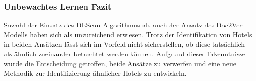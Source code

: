 \subsubsection{Unbewachtes Lernen Fazit}
\label{subsubsec:un_fazit}
Sowohl der Einsatz des DBScan-Algorithmus als auch der Ansatz des Doc2Vec-Modells haben sich als unzureichend erwiesen. Trotz der Identifikation von Hotels in beiden Ansätzen lässt sich im Vorfeld nicht sicherstellen, ob diese tatsächlich als ähnlich zueinander betrachtet werden können. Aufgrund dieser Erkenntnisse wurde die Entscheidung getroffen, beide Ansätze zu verwerfen und eine neue Methodik zur Identifizierung ähnlicher Hotels zu entwickeln.